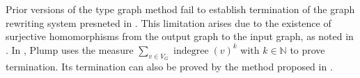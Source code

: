 Prior versions of the type graph method \cite{bruggink2014termination,bruggink2015proving,endrullis2023generalized} fail to establish termination of the graph rewriting system presneted in . This limitation arises due to the existence of surjective homomorphisms from the output graph to the input graph, as noted in \cite{endrullis2023generalized}. In \cite{plump2018modular}, Plump uses the measure $\sum_{v\in V_G} \operatorname{indegree}(v)^k$ with $k \in \mathbb{N}$ to prove termination. Its termination can also be proved by the method proposed in \cite{overbeek2023termination}.

